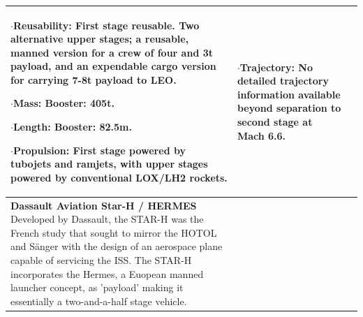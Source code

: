 {\begin{landscape}
\begin{xltabular}{\linewidth}{|X|X|X|}
	$\cdot$\textbf{Reusability:} First stage reusable. Two alternative upper stages; a reusable, manned version for a crew of four and 3t payload, and an expendable cargo version for carrying 7-8t payload to LEO. 
	
	$\cdot$\textbf{Mass:} Booster: 405t. 
	
	$\cdot$\textbf{Length:} Booster: 82.5m.
	
	$\cdot$\textbf{Propulsion:} First stage powered by tubojets and ramjets, with upper stages powered by conventional LOX/LH2 rockets. 
	
	&\small
	$\cdot$\textbf{Trajectory:} No detailed trajectory information available beyond separation to second stage at Mach 6.6. 
	\\
	\hline \small 
	\textbf{Dassault Aviation Star-H / HERMES} \cite{Aberleen}\newline\newline
Developed by Dassault, the STAR-H was the French study that sought to mirror the HOTOL and S{\"a}nger with the design of an aerospace plane capable of servicing the ISS. The STAR-H incorporates the Hermes, a Euopean manned launcher concept, as 'payload' making it essentially a two-and-a-half stage vehicle. 
	
	
	&\small
{}


\end{xltabular}
\end{landscape}}
